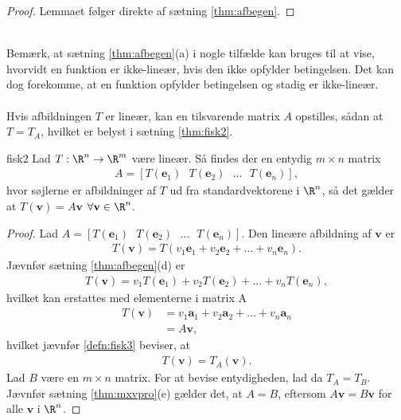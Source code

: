 %
\begin{proof}
Lemmaet følger direkte af sætning \ref{thm:afbegen}.
\end{proof}
\\
%
Bemærk, at sætning \ref{thm:afbegen}(a) i nogle tilfælde kan bruges til at vise, hvorvidt en funktion er ikke-lineær, hvis den ikke opfylder betingelsen. 
Det kan dog forekomme, at en funktion opfylder betingelsen og stadig er ikke-lineær.
% 
\\\\
% 
Hvis afbildningen $T$ er lineær, kan en tilsvarende matrix $A$ opstilles, sådan at $T=T_A$, hvilket er belyst i sætning \ref{thm:fisk2}.
%
% 
\begin{thm}{}{fisk2}
Lad $T: \R^n \rightarrow \R^m$ være lineær. 
Så findes der en entydig $m \times n$ matrix
\begin{align*}
A= [T(\mathbf{e}_1)\text{    } T(\mathbf{e}_2) \text{    } \ldots \text{    } T(\mathbf{e}_n)],
\end{align*}
hvor søjlerne er afbildninger af $T$ ud fra standardvektorene i $\R^n$, så det gælder at $T(\mathbf{v})=A \mathbf{v}$  $\forall \mathbf{v} \in \R^n$.
\end{thm}
%
%
\begin{proof}
Lad $A= [T(\mathbf{e}_1)\text{    } T(\mathbf{e}_2) \text{    } \ldots \text{    } T(\mathbf{e}_n)]$. 
Den lineære afbildning af $\mathbf{v}$ er
%
\begin{align*}
T(\mathbf{v})= T(v_1 \mathbf{e}_1+v_2 \mathbf{e}_2+ \ldots + v_n \mathbf{e}_n).
\end{align*}
%
Jævnfør sætning \ref{thm:afbegen}(d) er
%
\begin{align*}
T(\mathbf{v})= v_1 T( \mathbf{e}_1)+ v_2 T( \mathbf{e}_2) + \ldots + v_n T( \mathbf{e}_n),
\end{align*}
%
hvilket kan erstattes med elementerne i matrix A
%
\begin{align*}
T(\mathbf{v})&= v_1 \mathbf{a}_1+ v_2 \mathbf{a}_2 + \ldots + v_n \mathbf{a}_n \\
&= A \mathbf{v},
\end{align*}
hvilket jævnfør \ref{defn:fisk3} beviser, at
%
\begin{align*}
T(\mathbf{v})= T_A (\mathbf{v}).
\end{align*}
%
Lad $B$ være en $m \times n$ matrix. 
For at bevise entydigheden, lad da $T_A=T_B$. 
Jævnfør sætning \ref{thm:mxvpro}(e) gælder det, at $A=B$, eftersom $A \mathbf{v}=B \mathbf{v}$ for alle $\mathbf{v}$ i $\R^n$.
\end{proof}
